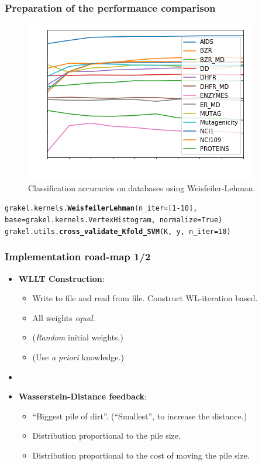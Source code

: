 \begin{frame}[noframenumbering]
	\frametitle{Preparation of the performance comparison}	
	\begin{figure}
		\centering
		\includegraphics[width=0.6\linewidth]{images/plot_whiteText}
		\caption{Classification accuracies on databases using Weisfeiler-Lehman.}
		\label{fig:plot}
	\end{figure}
	\tiny{\texttt{grakel.kernels.\textbf{WeisfeilerLehman}(n\_iter=[1-10], base=grakel.kernels.VertexHistogram, normalize=True)}}\\
	\tiny{\texttt{grakel.utils.\textbf{cross\_validate\_Kfold\_SVM}(K, y, n\_iter=10)}}

\end{frame}


\begin{frame}[noframenumbering]
\frametitle{Implementation road-map 1/2}
\begin{itemize}
	\item \textbf{WLLT Construction}:
		\begin{itemize}
			\item Write to file and read from file. Construct WL-iteration based.
			\item All weights \textit{equal}.
			\item (\textit{Random} initial weights.)
			\item (Use \textit{a priori} knowledge.)
		\end{itemize}
	\item[]
	\item \textbf{Wasserstein-Distance feedback}:
		\begin{itemize}
			\item \enquote{Biggest pile of dirt}. 
			(\enquote{Smallest}, to increase the distance.)
			\item Distribution proportional to the pile size.
			\item Distribution proportional to the cost of moving the pile size.
		\end{itemize}	
\end{itemize}	
\end{frame}

